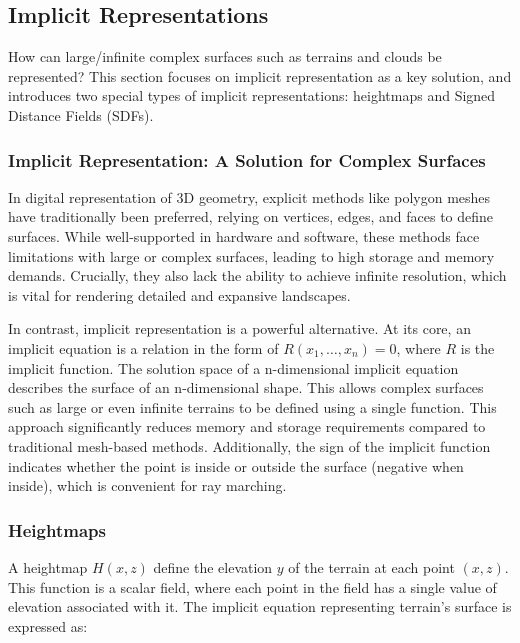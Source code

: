 \subsection{Implicit Representations}

How can large/infinite complex surfaces such as terrains and clouds be represented? This section focuses on implicit representation as a key solution, and introduces two special types of  implicit representations: heightmaps and Signed Distance Fields (SDFs).


\subsubsection{Implicit Representation: A Solution for Complex Surfaces}

In digital representation of 3D geometry, explicit methods  like polygon meshes have traditionally been preferred, relying on vertices, edges, and faces to define surfaces. While well-supported in hardware and software, these methods face limitations with large or complex surfaces, leading to high storage and memory demands. Crucially, they also lack the ability to achieve infinite resolution, which is vital for rendering detailed and expansive landscapes.

In contrast, implicit  representation is a powerful alternative. At its core, an implicit equation is a relation in the form of $R(x_1,\dots,x_n)=0$, where $R$ is the implicit function. The solution space of a n-dimensional implicit equation describes the surface of an n-dimensional shape. This allows complex surfaces such as large or even infinite terrains to be defined using a single function. This approach significantly reduces memory and storage requirements compared to traditional mesh-based methods. Additionally, the sign of the implicit function indicates whether the point is inside or outside the surface (negative when inside), which is convenient for ray marching.

\subsubsection{Heightmaps}
\label{Heightmap}

A heightmap $H(x,z)$ define the elevation $y$ of the terrain at each point $(x,z)$. This function is a scalar field, where each point in the field has a single value of elevation associated with it. The implicit equation representing terrain's surface is expressed as:

